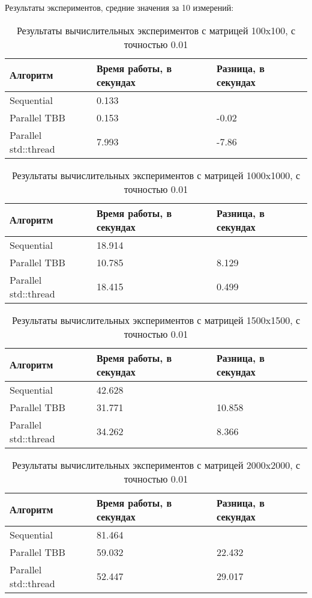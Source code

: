 \documentclass{report}
\begin{document}
\par Результаты экспериментов, средние значения за 10 измерений:

\begin{table}[!ht]
\caption{Результаты вычислительных экспериментов с матрицей 100x100, с точностью 0.01}
\centering
\begin{tabular}{| p{5cm} | p{5cm} | p{5cm} |}
\hline
Алгоритм & Время работы, в секундах & Разница, в секундах  \\[5pt]
\hline
Sequential              & 0.133       &  \\
Parallel TBB            & 0.153       & -0.02 \\
Parallel std::thread    & 7.993       & -7.86 \\
\hline
\end{tabular}
\end{table}

\begin{table}[!ht]
\caption{Результаты вычислительных экспериментов с матрицей 1000x1000, с точностью 0.01}
\centering
\begin{tabular}{| p{5cm} | p{5cm} | p{5cm} |}
\hline
Алгоритм & Время работы, в секундах & Разница, в секундах  \\[5pt]
\hline
Sequential              & 18.914       &  \\
Parallel TBB            & 10.785       & 8.129 \\
Parallel std::thread    & 18.415       & 0.499 \\
\hline
\end{tabular}
\end{table}

\begin{table}[!ht]
\caption{Результаты вычислительных экспериментов с матрицей 1500x1500, с точностью 0.01}
\centering
\begin{tabular}{| p{5cm} | p{5cm} | p{5cm} |}
\hline
Алгоритм & Время работы, в секундах & Разница, в секундах \\[5pt]
\hline
Sequential              & 42.628       &  \\
Parallel TBB            & 31.771       & 10.858 \\
Parallel std::thread    & 34.262       & 8.366 \\
\hline
\end{tabular}
\end{table}

\begin{table}[!ht]
\caption{Результаты вычислительных экспериментов с матрицей 2000x2000, с точностью 0.01}
\centering
\begin{tabular}{| p{5cm} | p{5cm} | p{5cm} |}
\hline
Алгоритм & Время работы, в секундах & Разница, в секундах  \\[5pt]
\hline
Sequential              & 81.464       &  \\
Parallel TBB            & 59.032       & 22.432 \\
Parallel std::thread    & 52.447       & 29.017 \\
\hline
\end{tabular}
\end{table}
\end{document}

